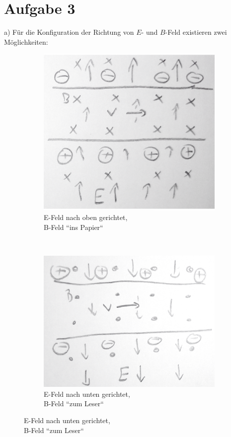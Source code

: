 \documentclass[11pt a4paper]{article}
\begin{document}
\newpage
\section*{Aufgabe 3}
a) Für die Konfiguration der Richtung von $E$- und $B$-Feld existieren zwei
Möglichkeiten:
\begin{figure}[H]
	\centering
	\begin{subfigure}[b]{0.3\textwidth}
		\includegraphics[width=\textwidth]
		{aufgabe3a_efeld_oben.png}
		\caption{E-Feld nach oben gerichtet,\\B-Feld ``ins Papier``}
	\end{subfigure}
	~
	\begin{subfigure}[b]{0.3\textwidth}
		\includegraphics[width=\textwidth]
		{aufgabe3a_efeld_unten.png}
		\caption{E-Feld nach unten gerichtet,\\B-Feld ``zum Leser``}
	\end{subfigure}
\end{figure}
\end{document}
